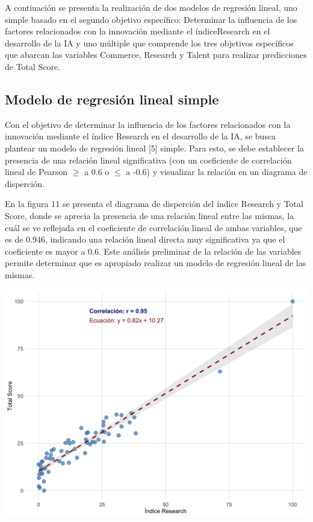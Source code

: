 \documentclass[
]{article}
\begin{document}
\begin{multicols}{2}
A contiuación se presenta la realización de dos modelos de regresión lineal, uno simple basado en el segundo objetivo específico: Determinar la influencia de los factores relacionados con la innovación mediante el índiceResearch en el desarrollo de la IA y uno múltiple que comprende los tres objetivos específicos que abarcan las variables Commerce, Research y Talent para realizar predicciones de Total Score.

\subsection{Modelo de regresión lineal simple}

Con el objetivo de determinar la influencia de los factores relacionados con la innovación mediante el índice Research en el desarrollo de la IA, se busca plantear un modelo de regresión lineal [5] simple. Para esto, se debe establecer la presencia de una relación lineal significativa (con un coeficiente de correlación lineal de Pearson $≥$ a 0.6 o $≤$ a -0.6) y visualizar la relación en un diagrama de disperción.




En la figura 11 se presenta el diagrama de disperción del índice Research y Total Score, donde se aprecia la presencia de una relación lineal entre las mismas, la cuál se ve reflejada en el coeficiente de correlación lineal de ambas variables, que es de 0.946, indicando una relación lineal directa muy significativa ya que el coeficiente es mayor a 0.6. Este análisis preliminar de la relación de las variables permite determinar que es apropiado realizar un modelo de regresión lineal de las mismas.



\begin{center}
\includegraphics[width=\linewidth]{figura11.png}
\end{center}


\end{multicols}
\end{document}

